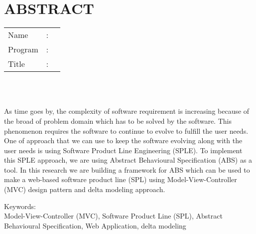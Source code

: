 %
%

\chapter*{ABSTRACT}

\vspace*{0.2cm}

\noindent \begin{tabular}{l l p{11.0cm}}
	Name&: & \penulis \\
	Program&: & \programEng \\
	Title&: & \judulInggris \\
\end{tabular} \\ 

\vspace*{0.5cm}

\noindent 
\\ As time goes by, the complexity of software requirement is increasing because of the broad of problem domain which has to be solved by the software. This phenomenon requires the software to continue to evolve to fulfill the user needs. One of approach that we can use to keep the software evolving along with the user needs is using Software Product Line Engineering (SPLE). To implement this SPLE approach, we are using Abstract Behavioural Specification (ABS) as a tool. In this research we are building a framework for ABS which can be used to make a web-based software product line (SPL) using Model-View-Controller (MVC) design pattern and delta modeling approach.

\vspace*{0.2cm}

\noindent Keywords: \\ 
\noindent Model-View-Controller (MVC), Software Product Line (SPL), Abstract Behavioural Specification, Web Application, delta modeling\\

\newpage